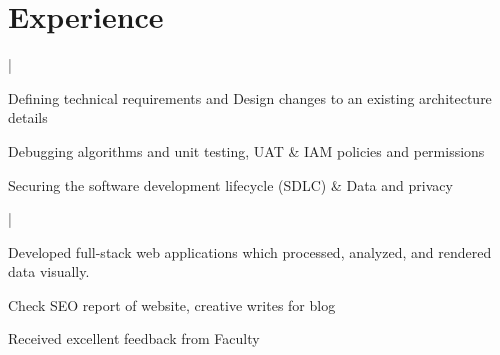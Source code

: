 \documentclass[letterpaper]{deedy-resume}
\begin{document}
\begin{minipage}[t]{0.66\textwidth} 

\section{Experience}

 |

\vspace{\topsep} 
\begin{tightitemize}
\item Defining technical requirements and Design changes to an existing architecture details
\item Debugging algorithms and unit testing, UAT \& IAM policies and permissions
\item Securing the software development lifecycle (SDLC) \& Data and privacy
\end{tightitemize}
\sectionspace 


 |

\vspace{\topsep} 
\begin{tightitemize}
\item Developed full-stack web applications which
processed, analyzed, and rendered data visually.
\item Check SEO report of website, creative writes for blog
\item Received excellent feedback from Faculty
\end{tightitemize}

\sectionspace 








\end{minipage}
\end{document}
